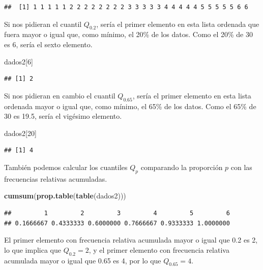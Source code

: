 \documentclass[]{book}
\newenvironment{Shaded}{\begin{snugshade}}{\end{snugshade}}
\newcommand{\DecValTok}[1]{\textcolor[rgb]{0.00,0.00,0.81}{#1}}
\newcommand{\KeywordTok}[1]{\textcolor[rgb]{0.13,0.29,0.53}{\textbf{#1}}}
\newcommand{\NormalTok}[1]{#1}
\theoremstyle{definition}
\theoremstyle{definition}
\theoremstyle{definition}
\theoremstyle{remark}
\begin{document}
\begin{verbatim}
##  [1] 1 1 1 1 1 2 2 2 2 2 2 2 2 3 3 3 3 3 4 4 4 4 4 5 5 5 5 5 6 6
\end{verbatim}

Si nos pidieran el cuantil \(Q_{0.2}\), sería el primer elemento en esta lista ordenada que fuera mayor o igual que, como mínimo, el 20\% de los datos. Como el 20\% de 30 es 6, sería el sexto elemento.

\begin{Shaded}
\begin{Highlighting}[]
\NormalTok{dados2[}\DecValTok{6}\NormalTok{]}
\end{Highlighting}
\end{Shaded}

\begin{verbatim}
## [1] 2
\end{verbatim}

Si nos pidieran en cambio el cuantil \(Q_{0.65}\), sería el primer elemento en esta lista ordenada mayor o igual que, como mínimo, el 65\% de los datos. Como el 65\% de 30 es 19.5, sería el vigésimo elemento.

\begin{Shaded}
\begin{Highlighting}[]
\NormalTok{dados2[}\DecValTok{20}\NormalTok{]}
\end{Highlighting}
\end{Shaded}

\begin{verbatim}
## [1] 4
\end{verbatim}

También podemos calcular los cuantiles \(Q_p\) comparando la proporción \(p\) con las frecuencias relativas acumuladas.

\begin{Shaded}
\begin{Highlighting}[]
\KeywordTok{cumsum}\NormalTok{(}\KeywordTok{prop.table}\NormalTok{(}\KeywordTok{table}\NormalTok{(dados2)))}
\end{Highlighting}
\end{Shaded}

\begin{verbatim}
##         1         2         3         4         5         6 
## 0.1666667 0.4333333 0.6000000 0.7666667 0.9333333 1.0000000
\end{verbatim}

El primer elemento con frecuencia relativa acumulada mayor o igual que 0.2 es 2, lo que implica que \(Q_{0.2}=2\), y el primer elemento con frecuencia relativa acumulada mayor o igual que 0.65 es 4, por lo que \(Q_{0.65}=4\).
\end{document}
